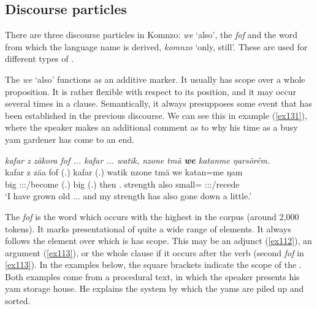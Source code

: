 \subsection{Discourse particles} \label{discourse-particles}

There are three discourse particles in Komnzo: \emph{we} `also', the  \emph{fof} and the word from which the language name is derived, \emph{komnzo} `only, still'. These are used for different types of .

The  \emph{we} `also' functions as an additive  marker. It usually has scope over a whole proposition. It is rather flexible with respect to its position, and it may occur several times in a clause. Semantically, it always presupposes some event that has been established in the previous discourse. We can see this in example (\ref{ex131}), where the speaker makes an additional comment as to why his time as a busy yam gardener has come to an end.

\begin{exe}
	\ex \emph{kafar z zäkora fof ... kafar ... watik, nzone tmä \textbf{we} katanme ŋarsörém.}\\
	\gll kafar z zäa fof (.) kafar (.) watik nzone tmä we katan=me ŋam\\
	big {\Iam} \Fsg:\Sbj:\Pst:\Pfv/become {\Emph} (.) big (.) then \Fsg{}.{\Poss} strength also small={\Ins} \Stsg:\Sbj:\Rpst:\Dur/recede\\
	\trans `I have grown old ... and my strength has also gone down a little.'\\ 
	\label{ex131}
\end{exe}

The  \emph{fof} is the word which occurs with the highest  in the corpus (around 2,000 tokens). It marks presentational  of quite a wide range of elements. It always follows the element over which is has scope. This may be an adjunct (\ref{ex112}), an argument (\ref{ex113}), or the whole clause if it occurs after the verb (second \emph{fof} in \ref{ex113}). In the examples below, the square brackets indicate the scope of the . Both examples come from a procedural text, in which the speaker presents his yam storage house. He explains the system by which the yams are piled up and sorted.

